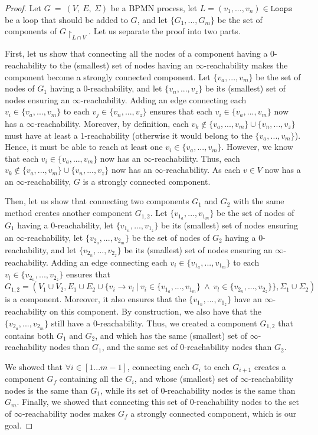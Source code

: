 \documentclass{article}
\newcommand{\closedarray}[2]{[#1...#2]}
\newcommand{\graph}{G~=~(V,~E,~\Sigma)}
\newcommand{\loops}{\ensuremath{\mathtt{Loops}}}
\newcommand{\restrictionof}[2]{\ensuremath{#1\restriction_{#2}}}
\begin{document}
	\begin{proof}
		Let $\graph$ be a BPMN process, let $L = (v_1, ..., v_n) \in \loops$ be a loop that should be added to $G$, and let $\{G_1, ..., G_m\}$ be the set of components of $\restrictionof{G}{L \cap V}$.
		Let us separate the proof into two parts.
		
		First, let us show that connecting all the nodes of a component having a $0$-reachability to the (smallest) set of nodes having an $\infty$-reachability makes the component become a strongly connected component.
		Let $\{v_a, ..., v_m\}$ be the set of nodes of $G_1$ having a $0$-reachability, and let $\{v_n, ..., v_z\}$ be its (smallest) set of nodes ensuring an $\infty$-reachability.
		Adding an edge connecting each $v_i \in \{v_a, ..., v_m\}$ to each $v_j \in \{v_n, ..., v_z\}$ ensures that each $v_i \in \{v_a, ..., v_m\}$ now has a $\infty$-reachability.
		Moreover, by definition, each $v_k \notin \{v_a, ..., v_m\} \cup \{v_n, ..., v_z\}$ must have at least a 1-reachability (otherwise it would belong to the $\{v_a, ..., v_m\}$).
		Hence, it must be able to reach at least one $v_i \in \{v_a, ..., v_m\}$.
		However, we know that each $v_i \in \{v_a, ..., v_m\}$ now has an $\infty$-reachability.
		Thus, each $v_k \notin \{v_a, ..., v_m\} \cup \{v_n, ..., v_z\}$ now has an $\infty$-reachability.
		As each $v \in V$ now has a an $\infty$-reachability, $G$ is a strongly connected component.
		
		Then, let us show that connecting two components $G_1$ and $G_2$ with the same method creates another component $G_{1,2}$.
		Let $\{v_{1_a}, ..., v_{1_m}\}$ be the set of nodes of $G_1$ having a $0$-reachability, let $\{v_{1_n}, ..., v_{1_z}\}$ be its (smallest) set of nodes ensuring an $\infty$-reachability, let $\{v_{2_a}, ..., v_{2_m}\}$ be the set of nodes of $G_2$ having a $0$-reachability, and let $\{v_{2_n}, ..., v_{2_z}\}$ be its (smallest) set of nodes ensuring an $\infty$-reachability.
		Adding an edge connecting each $v_i \in \{v_{1_a}, ..., v_{1_m}\}$ to each $v_l \in \{v_{2_n}, ..., v_{2_z}\}$ ensures that $G_{1,2} = (V_1 \cup V_2, E_1 \cup E_2 \cup \{v_i \rightarrow v_l\ \vert\ v_i \in \{v_{1_a}, ..., v_{1_m}\}\ \land\ v_l \in \{v_{2_n}, ..., v_{2_z}\}\}, \Sigma_1 \cup \Sigma_2)$ is a component.
		Moreover, it also ensures that the $\{v_{1_n}, ..., v_{1_z}\}$ have an $\infty$-reachability on this component.
		By construction, we also have that the $\{v_{2_a}, ..., v_{2_m}\}$ still have a $0$-reachability.
		Thus, we created a component $G_{1,2}$ that contains both $G_1$ and $G_2$, and which has the same (smallest) set of $\infty$-reachability nodes than $G_1$, and the same set of $0$-reachability nodes than $G_2$.
		
		We showed that $\forall i \in \closedarray{1}{m-1}$, connecting each $G_i$ to each $G_{i+1}$ creates a component $G_f$ containing all the $G_i$, and whose (smallest) set of $\infty$-reachability nodes is the same than $G_1$, while its set of $0$-reachability nodes is the same than $G_m$.
		Finally, we showed that connecting this set of $0$-reachability nodes to the set of $\infty$-reachability nodes makes $G_f$ a strongly connected component, which is our goal.
	\end{proof}
\end{document}
